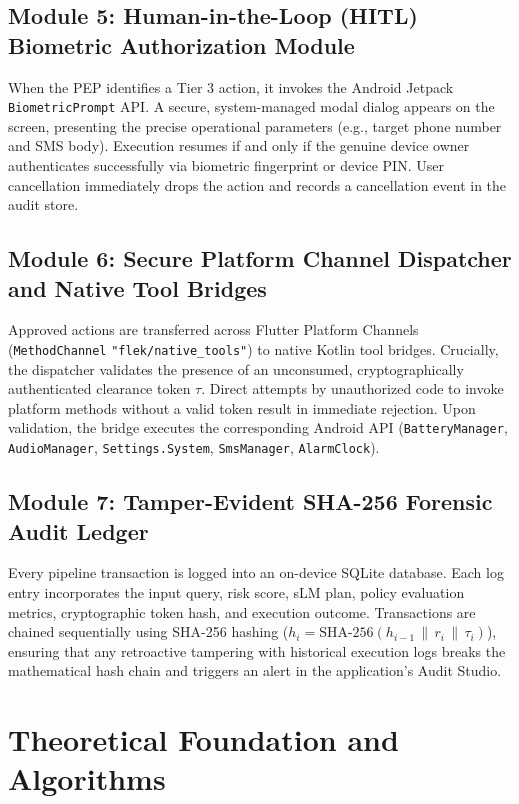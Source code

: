 \subsection{Module 5: Human-in-the-Loop (HITL) Biometric Authorization Module}
When the PEP identifies a Tier 3 action, it invokes the Android Jetpack \texttt{BiometricPrompt} API. A secure, system-managed modal dialog appears on the screen, presenting the precise operational parameters (e.g., target phone number and SMS body). Execution resumes if and only if the genuine device owner authenticates successfully via biometric fingerprint or device PIN. User cancellation immediately drops the action and records a cancellation event in the audit store.

\subsection{Module 6: Secure Platform Channel Dispatcher and Native Tool Bridges}
Approved actions are transferred across Flutter Platform Channels (\texttt{MethodChannel} \texttt{"flek/native\_tools"}) to native Kotlin tool bridges. Crucially, the dispatcher validates the presence of an unconsumed, cryptographically authenticated clearance token $\tau$. Direct attempts by unauthorized code to invoke platform methods without a valid token result in immediate rejection. Upon validation, the bridge executes the corresponding Android API (\texttt{BatteryManager}, \texttt{AudioManager}, \texttt{Settings.System}, \texttt{SmsManager}, \texttt{AlarmClock}).

\subsection{Module 7: Tamper-Evident SHA-256 Forensic Audit Ledger}
Every pipeline transaction is logged into an on-device SQLite database. Each log entry incorporates the input query, risk score, sLM plan, policy evaluation metrics, cryptographic token hash, and execution outcome. Transactions are chained sequentially using SHA-256 hashing ($h_i = \text{SHA-256}(h_{i-1} \,\|\, r_i \,\|\, \tau_i)$), ensuring that any retroactive tampering with historical execution logs breaks the mathematical hash chain and triggers an alert in the application's Audit Studio.

\section{Theoretical Foundation and Algorithms}

